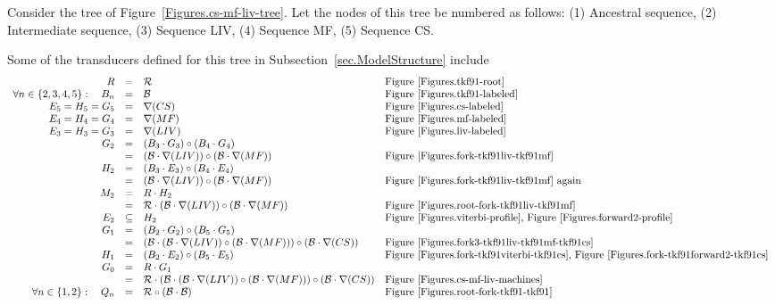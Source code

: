 \documentclass{article}
\newcommand{\secref}[1]{Subsection~\ref{sec.#1}}
\newcommand{\figref}[1]{Figure~\ref{Figures.#1}}
\newcommand\tkf{{\cal B}}
\newcommand\tkfroot{{\cal R}}
\newcommand\fork{\circ}
\newcommand\recognize{\nabla}
\begin{document}
Consider the tree of \figref{cs-mf-liv-tree}.
Let the nodes of this tree be numbered as follows:
(1) Ancestral sequence,
(2) Intermediate sequence,
(3) Sequence LIV,
(4) Sequence MF,
(5) Sequence CS.

Some of the transducers defined for this tree in \secref{ModelStructure} include
\[
\begin{array}{rcll}
R & = & \tkfroot & \mbox{\figref{tkf91-root}} \\
\forall n \in \{ 2, 3, 4, 5 \} : \quad B_n & = & \tkf & \mbox{\figref{tkf91-labeled}} \\
E_5 = H_5 = G_5 & = & \recognize(CS) & \mbox{\figref{cs-labeled}} \\
E_4 = H_4 = G_4 & = & \recognize(MF) & \mbox{\figref{mf-labeled}} \\
E_3 = H_3 = G_3 & = & \recognize(LIV) & \mbox{\figref{liv-labeled}} \\
G_2 & = & (B_3 \cdot G_3) \fork (B_4 \cdot G_4) & \\
& = & ( \tkf \cdot \recognize(LIV) ) \fork ( \tkf \cdot \recognize(MF) ) & \mbox{\figref{fork-tkf91liv-tkf91mf}} \\
H_2 & = & (B_3 \cdot E_3) \fork (B_4 \cdot E_4) & \\
& = & ( \tkf \cdot \recognize(LIV) ) \fork ( \tkf \cdot \recognize(MF) ) & \mbox{\figref{fork-tkf91liv-tkf91mf} again} \\
M_2 & = & R \cdot H_2 & \\
    & = & \tkfroot \cdot ( \tkf \cdot \recognize(LIV) ) \fork ( \tkf \cdot \recognize(MF) ) & \mbox{\figref{root-fork-tkf91liv-tkf91mf}} \\
E_2 & \subseteq & H_2 & \mbox{\figref{viterbi-profile}, \figref{forward2-profile}} \\
G_1 & = & (B_2 \cdot G_2) \fork (B_5 \cdot G_5) & \\
& = & (\tkf \cdot (\tkf \cdot \recognize(LIV))\fork(\tkf \cdot \recognize(MF)))\fork(\tkf \cdot \recognize(CS)) & \mbox{\figref{fork3-tkf91liv-tkf91mf-tkf91cs}} \\
H_1 & = & (B_2 \cdot E_2) \fork (B_5 \cdot E_5) & \mbox{\figref{fork-tkf91viterbi-tkf91cs}, \figref{fork-tkf91forward2-tkf91cs}} \\
G_0 & = & R \cdot G_1 & \\
& = & \tkfroot \cdot (\tkf \cdot (\tkf \cdot \recognize(LIV))\fork(\tkf \cdot \recognize(MF)))\fork(\tkf \cdot \recognize(CS)) & \mbox{\figref{cs-mf-liv-machines}} \\
\forall n \in \{1,2\}: \quad Q_n & = & \tkfroot \fork (\tkf \cdot \tkf) & \mbox{\figref{root-fork-tkf91-tkf91}} \\
\end{array}
\]
\end{document}
